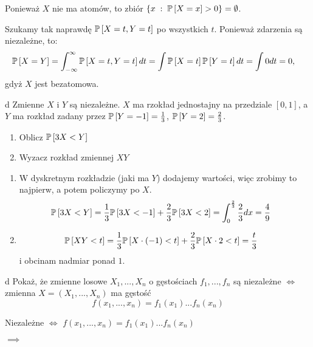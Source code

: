 \documentclass{article}
\begin{document}
Ponieważ $X$ nie ma atomów, to zbiór $\{x\;:\;\prob{X=x}>0\}=\emptyset$.

Szukamy tak naprawdę $\prob{X=t, Y=t}$ po wszystkich $t$. Ponieważ zdarzenia są niezależne, to:
\begin{align*}
    \prob{X=Y}&=\int_{-\infty}^\infty\prob{X=t, Y=t}dt=\int\prob{X=t}\prob{Y=t}dt=\int0dt=0,
\end{align*}
gdyż $X$ jest bezatomowa.

\begin{problem}[6]{d}
Zmienne $X$ i $Y$ są niezależne. $X$ ma rzokład jednostajny na przedziale $[0,1]$, a $Y$ ma rozkład zadany przez $\prob{Y=-1}=\frac{1}{3}$, $\prob{Y=2}=\frac{2}{3}$.
\begin{enumerate}[label=(\alph*)]
    \item Oblicz $\prob{3X<Y}$
    \item Wyzacz rozkład zmiennej $XY$
\end{enumerate}
\end{problem}

\begin{enumerate}[label=(\alph*), leftmargin=*]
    \item W dyskretnym rozkładzie (jaki ma $Y$) dodajemy wartości, więc zrobimy to najpierw, a potem policzymy po $X$.
    \begin{align*}
        \prob{3X<Y}&=\frac{1}{3}\prob{3X<-1}+\frac{2}{3}\prob{3X<2}=\int_0^\frac{2}{3}\frac{2}{3}dx=\frac{4}{9}
    \end{align*}
    \item \begin{align*}
        \prob{XY<t}&=\frac{1}{3}\prob{X\cdot(-1)<t}+\frac{2}{3}\prob{X\cdot 2<t}=\frac{t}{3}
    \end{align*}
    i obcinam nadmiar ponad $1$.
\end{enumerate}



\begin{problem}[7]{d}
Pokaż, że zmienne losowe $X_1,...,X_n$ o gęstościach $f_1,...,f_n$ są niezależne $\iff$ zmienna $X=(X_1,...,X_n)$ ma gęstość
$$f(x_1,...,x_n)=f_1(x_1)...f_n(x_n)$$
\end{problem}

\begin{center}
Niezależne $\iff$ $f(x_1,...,x_n)=f_1(x_1)...f_n(x_n)$
\end{center}

$\implies$
\end{document}
